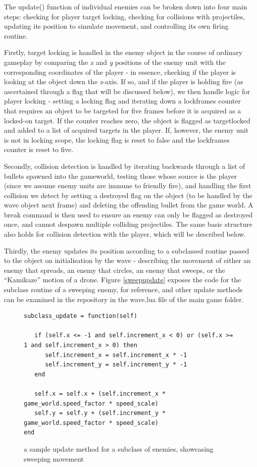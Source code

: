 \documentclass[11pt]{article}
\begin{document}
The update() function of individual enemies can be broken down into four main steps: checking for
player target locking, checking for collisions with projectiles, updating its position to simulate
movement, and controlling its own firing routine.

Firstly, target locking is handled in the enemy object in the course of ordinary gameplay by comparing
the \textit{x} and \textit{y} positions of the enemy unit with the corresponding coordinates of the
player - in essence, checking if the player is looking at the object down the \textit{z}-axis. If so,
and if the player is holding fire (as ascertained through a flag that will be discussed below), we then
handle logic for player locking - setting a locking flag and iterating down a lock\textunderscore frames
counter that requires an object to be targeted for five frames before it is acquired as a locked-on
target. If the counter reaches zero, the object is flagged as target\textunderscore locked and added to
a list of acquired targets in the player. If, however, the enemy unit is not in locking scope, the locking
flag is reset to false and the lock\textunderscore frames counter is reset to five.

Secondly, collision detection is handled by iterating backwards through a list of bullets spawned into
the game\textunderscore world, testing those whose source is the player (since we assume enemy units are immune to friendly
fire), and handling the first collision we detect by setting a destroyed flag on the object (to be handled
by the wave object next frame) and deleting the offending bullet from the game world. A break command is then
used to ensure an enemy can only be flagged as destroyed once, and cannot despawn multiple colliding
projectiles. The same basic structure also holds for collision detection with the player, which will be
described below.

Thirdly, the enemy updates its position according to a subclassed routine passed to the object on
initialisation by the wave - describing the movement of either an enemy that spreads, an enemy that circles,
an enemy that sweeps, or the ``Kamikaze'' motion of a drone. Figure \ref{sweepupdate} exposes the code
for the subclass routine of a sweeping enemy, for reference, and other update methods can be examined
in the repository in the wave.lua file of the main game folder.

\begin{figure}[h]
   \begin{lstlisting}
subclass_update = function(self)

   if (self.x <= -1 and self.increment_x < 0) or (self.x >= 1 and self.increment_x > 0) then
      self.increment_x = self.increment_x * -1
      self.increment_y = self.increment_y * -1
   end

   self.x = self.x + (self.increment_x * game_world.speed_factor * speed_scale)
   self.y = self.y + (self.increment_y * game_world.speed_factor * speed_scale)
end
   \end{lstlisting}
   \caption{a sample update method for a subclass of enemies, showcasing sweeping movement}
   \label{fig:sweepupdate}
\end{figure}
\end{document}
